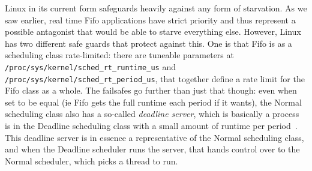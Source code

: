 Linux in its current form safeguards heavily against any form of starvation. As
we saw earlier, real time Fifo applications have strict priority and thus
represent a possible antagonist that would be able to starve everything else.
However, Linux has two different safe guards that protect against this. One is
that Fifo is as a scheduling class rate-limited: there are tuneable parameters
at \texttt{/proc/sys/kernel/sched\_rt\_runtime\_us} and
\texttt{/proc/sys/kernel/sched\_rt\_period\_us}, that together define a rate
limit for the Fifo class as a whole. The failsafes go further than just that
though: even when set to be equal (ie Fifo gets the full runtime each period if
it wants), the Normal scheduling class also has a so-called \textit{deadline
server}, which is basically a process is in the Deadline scheduling class with a
small amount of runtime per period~\cite{TODO}. This deadline server is in
essence a representative of the Normal scheduling class, and when the Deadline
scheduler runs the server, that hands control over to the Normal scheduler,
which picks a thread to run.


